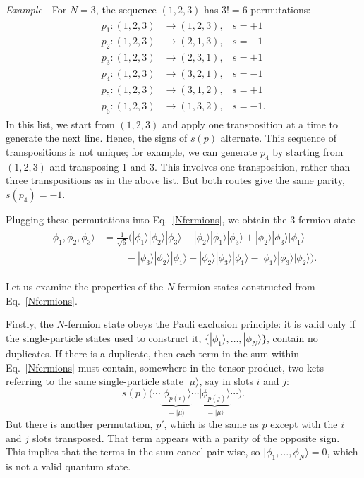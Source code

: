 \documentclass[prx,12pt]{revtex4-2}
\begin{document}
\begin{framed}
\noindent
\textit{Example}---For $N=3$, the sequence $(1,2,3)$ has $3!=6$ permutations:
\begin{align}
  \begin{aligned}
  p_1 : (1,2,3) &\rightarrow (1,2,3), \;\;\;s = +1 \\
  p_2 : (1,2,3) &\rightarrow (2,1,3), \;\;\;s = -1 \\
  p_3 : (1,2,3) &\rightarrow (2,3,1), \;\;\;s = +1 \\
  p_4 : (1,2,3) &\rightarrow (3,2,1), \;\;\;s = -1 \\
  p_5 : (1,2,3) &\rightarrow (3,1,2), \;\;\;s = +1 \\
  p_6 : (1,2,3) &\rightarrow (1,3,2), \;\;\;s = -1.\end{aligned}
\end{align}
In this list, we start from $(1,2,3)$ and apply one transposition at a
time to generate the next line.  Hence, the signs of $s(p)$ alternate.
This sequence of transpositions is not unique; for example, we can
generate $p_4$ by starting from $(1,2,3)$ and transposing 1 and 3.
This involves one transposition, rather than three transpositions as
in the above list.  But both routes give the same parity, $s(p_4) =
-1$.

Plugging these permutations into Eq.~\eqref{Nfermions}, we obtain the
3-fermion state
\begin{align}
  \begin{aligned}
    |\phi_1, \phi_2, \phi_3\rangle
    &= \frac{1}{\sqrt{6}} \Big(
    |\phi_1\rangle |\phi_2\rangle |\phi_3\rangle
    - |\phi_2\rangle |\phi_1\rangle |\phi_3\rangle
    + |\phi_2\rangle |\phi_3\rangle |\phi_1\rangle \\
    & \qquad\; 
    - |\phi_3\rangle |\phi_2\rangle |\phi_1\rangle
    + |\phi_2\rangle |\phi_3\rangle |\phi_1\rangle
    - |\phi_1\rangle |\phi_3\rangle |\phi_2\rangle \Big).
  \end{aligned}
\end{align}
\end{framed}

Let us examine the properties of the $N$-fermion states constructed
from Eq.~\eqref{Nfermions}.

Firstly, the $N$-fermion state obeys the Pauli exclusion principle: it
is valid only if the single-particle states used to construct it,
$\{|\phi_1\rangle, \dots, |\phi_N\rangle\}$, contain no duplicates.
If there is a duplicate, then each term in the sum within
Eq.~\eqref{Nfermions} must contain, somewhere in the tensor product,
two kets referring to the same single-particle state $|\mu\rangle$,
say in slots $i$ and $j$:
\begin{equation*}
s(p)\big( \cdots
      \underbrace{|\phi_{p(i)}\rangle}_{= |\mu\rangle} \cdots
      \underbrace{|\phi_{p(j)}\rangle}_{= |\mu\rangle} \cdots \big).
\end{equation*}
But there is another permutation, $p'$, which is the same as $p$
except with the $i$ and $j$ slots transposed.  That term appears with
a parity of the opposite sign.  This implies that the terms in the sum
cancel pair-wise, so $|\phi_1,\dots,\phi_N\rangle = 0$, which is not a
valid quantum state.
\end{document}
